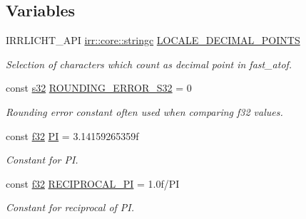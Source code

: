 \subsection*{Variables}
\begin{DoxyCompactItemize}
\item 
\mbox{\label{namespaceirr_1_1core_ac9e193c6850509dfee97f942b5f121a5}} 
I\+R\+R\+L\+I\+C\+H\+T\+\_\+\+A\+PI \hyperlink{namespaceirr_1_1core_ab26a0e0359206b5a694f35c37c829d7f}{irr\+::core\+::stringc} \hyperlink{namespaceirr_1_1core_ac9e193c6850509dfee97f942b5f121a5}{L\+O\+C\+A\+L\+E\+\_\+\+D\+E\+C\+I\+M\+A\+L\+\_\+\+P\+O\+I\+N\+TS}
\begin{DoxyCompactList}\small\item\em Selection of characters which count as decimal point in fast\+\_\+atof. \end{DoxyCompactList}\item 
\mbox{\label{namespaceirr_1_1core_aac9f99b6a999bdf25fec402c59e8342a}} 
const \hyperlink{namespaceirr_ac66849b7a6ed16e30ebede579f9b47c6}{s32} \hyperlink{namespaceirr_1_1core_aac9f99b6a999bdf25fec402c59e8342a}{R\+O\+U\+N\+D\+I\+N\+G\+\_\+\+E\+R\+R\+O\+R\+\_\+\+S32} = 0
\begin{DoxyCompactList}\small\item\em Rounding error constant often used when comparing f32 values. \end{DoxyCompactList}\item 
\mbox{\label{namespaceirr_1_1core_a26d877e2caf3e6f31c298a0417a0707e}} 
const \hyperlink{namespaceirr_a0277be98d67dc26ff93b1a6a1d086b07}{f32} \hyperlink{namespaceirr_1_1core_a26d877e2caf3e6f31c298a0417a0707e}{PI} = 3.\+14159265359f
\begin{DoxyCompactList}\small\item\em Constant for PI. \end{DoxyCompactList}\item 
\mbox{\label{namespaceirr_1_1core_ac97bfaa5b44703e61c23c91b88f3ec3a}} 
const \hyperlink{namespaceirr_a0277be98d67dc26ff93b1a6a1d086b07}{f32} \hyperlink{namespaceirr_1_1core_ac97bfaa5b44703e61c23c91b88f3ec3a}{R\+E\+C\+I\+P\+R\+O\+C\+A\+L\+\_\+\+PI} = 1.\+0f/\+PI
\begin{DoxyCompactList}\small\item\em Constant for reciprocal of PI. \end{DoxyCompactList}\item 

\end{DoxyCompactItemize}
